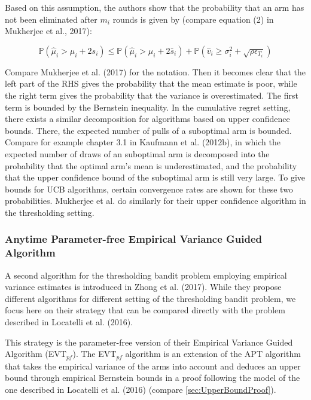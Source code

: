 \documentclass[11pt,]{article}
\begin{document}
Based on this assumption, the authors show that the probability that an
arm has not been eliminated after \(m_i\) rounds is given by (compare
equation (2) in Mukherjee et al., 2017):

\begin{equation} \label{Mukherjee2017Equation2}
\mathbb{P}(\hat{\mu}_i > \mu_i + 2s_i) \leq \mathbb{P} (\hat{\mu}_i > \mu_i + 2\bar{s}_i) + \mathbb{P}(\hat{v}_i \geq \sigma^2_i + \sqrt{\rho \epsilon_{T_i}})
\end{equation}

Compare Mukherjee et al. (2017) for the notation. Then it becomes clear
that the left part of the RHS gives the probability that the mean
estimate is poor, while the right term gives the probability that the
variance is overestimated. The first term is bounded by the Bernstein
inequality. In the cumulative regret setting, there exists a similar
decomposition for algorithms based on upper confidence bounds. There,
the expected number of pulls of a suboptimal arm is bounded. Compare for
example chapter 3.1 in Kaufmann et al. (2012b), in which the expected
number of draws of an suboptimal arm is decomposed into the probability
that the optimal arm's mean is underestimated, and the probability that
the upper confidence bound of the suboptimal arm is still very large. To
give bounds for UCB algorithms, certain convergence rates are shown for
these two probabilities. Mukherjee et al. do similarly for their upper
confidence algorithm in the thresholding setting.

\subsubsection{\texorpdfstring{Anytime Parameter-free Empirical Variance
Guided Algorithm
\label{sec:EVTAlgorithm}}{Anytime Parameter-free Empirical Variance Guided Algorithm }}\label{anytime-parameter-free-empirical-variance-guided-algorithm}

A second algorithm for the thresholding bandit problem employing
empirical variance estimates is introduced in Zhong et al. (2017). While
they propose different algorithms for different setting of the
thresholding bandit problem, we focus here on their strategy that can be
compared directly with the problem described in Locatelli et al. (2016).

This strategy is the parameter-free version of their Empirical Variance
Guided Algorithm (EVT\(_{pf}\)). The EVT\(_{pf}\) algorithm is an
extension of the APT algorithm that takes the empirical variance of the
arms into account and deduces an upper bound through empirical Bernstein
bounds in a proof following the model of the one described in Locatelli
et al. (2016) (compare \autoref{sec:UpperBoundProof}).
\end{document}
